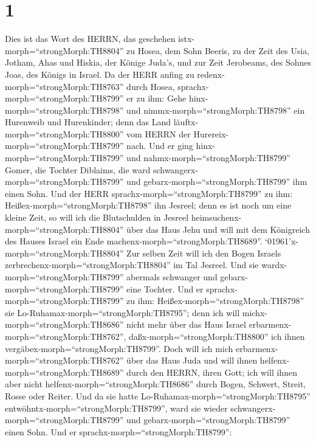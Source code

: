 \hypertarget{section}{%
\section{1}\label{section}}

 Dies ist das Wort des HERRN, das geschehen
istx-morph=``strongMorph:TH8804'' zu Hosea, dem Sohn Beeris, zu der Zeit
des Usia, Jotham, Ahas und Hiskia, der Könige Juda's, und zur Zeit
Jerobeams, des Sohnes Joas, des Königs in Israel.  Da der
HERR anfing zu redenx-morph=``strongMorph:TH8763'' durch Hosea,
sprachx-morph=``strongMorph:TH8799'' er zu ihm: Gehe
hinx-morph=``strongMorph:TH8798'' und nimmx-morph=``strongMorph:TH8798''
ein Hurenweib und Hurenkinder; denn das Land
läuftx-morph=``strongMorph:TH8800'' vom HERRN der
Hurereix-morph=``strongMorph:TH8799'' nach.  Und er ging
hinx-morph=``strongMorph:TH8799'' und nahmx-morph=``strongMorph:TH8799''
Gomer, die Tochter Diblaims, die ward
schwangerx-morph=``strongMorph:TH8799'' und
gebarx-morph=``strongMorph:TH8799'' ihm einen Sohn.  Und der
HERR sprachx-morph=``strongMorph:TH8799'' zu ihm:
Heißex-morph=``strongMorph:TH8798'' ihn Jesreel; denn es ist noch um
eine kleine Zeit, so will ich die Blutschulden in Jesreel
heimsuchenx-morph=``strongMorph:TH8804'' über das Haus Jehu und will mit
dem Königreich des Hauses Israel ein Ende
machenx-morph=``strongMorph:TH8689''. 
`01961'\textbar x-morph=``strongMorph:TH8804'' Zur selben Zeit will ich
den Bogen Israels zerbrechenx-morph=``strongMorph:TH8804'' im Tal
Jesreel.  Und sie wardx-morph=``strongMorph:TH8799''
abermals schwanger und gebarx-morph=``strongMorph:TH8799'' eine Tochter.
Und er sprachx-morph=``strongMorph:TH8799'' zu ihm:
Heißex-morph=``strongMorph:TH8798'' sie
Lo-Ruhamax-morph=``strongMorph:TH8795''; denn ich will
michx-morph=``strongMorph:TH8686'' nicht mehr über das Haus Israel
erbarmenx-morph=``strongMorph:TH8762'',
daßx-morph=``strongMorph:TH8800'' ich ihnen
vergäbex-morph=``strongMorph:TH8799''.  Doch will ich mich
erbarmenx-morph=``strongMorph:TH8762'' über das Haus Juda und will ihnen
helfenx-morph=``strongMorph:TH8689'' durch den HERRN, ihren Gott; ich
will ihnen aber nicht helfenx-morph=``strongMorph:TH8686'' durch Bogen,
Schwert, Streit, Rosse oder Reiter.  Und da sie hatte
Lo-Ruhamax-morph=``strongMorph:TH8795''
entwöhntx-morph=``strongMorph:TH8799'', ward sie wieder
schwangerx-morph=``strongMorph:TH8799'' und
gebarx-morph=``strongMorph:TH8799'' einen Sohn.  Und er
sprachx-morph=``strongMorph:TH8799'':
